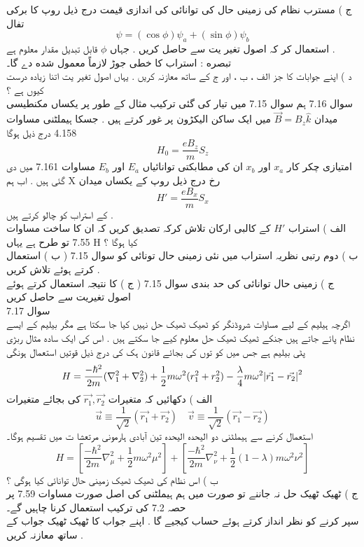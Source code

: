 ج ) مسترب نظام کی زمینی حال کی توانائی کی اندازی قیمت درج ذیل روپ کا برکی تفال
\[\psi=(\cos{\phi})\psi_{a}+(\sin{\phi})\psi_{b}\]
استعمال کر کہ اصول تغیر یت سے حاصل کریں . جہاں
\(\phi\)
قابل تبدیل مقدار معلوم ہے .\\
تبصره : استراب کا خطی جوڑ لازماً معمول شده دے گا۔\\
د ) اپنے جوابات کا جز الف ، ب ، اور ج کے ساتھ معازنہ کریں . یہاں اصول تغیر یت اتنا زیادہ درست کیوں ہے ؟\\
سوال 7.16
ہم سوال 7.15 میں تیار کی گئی ترکیب مثال کے طور پر  یکساں مکنطیسی میدان
\(\vec{B}=B_{z}\hat{k}\)
میں ایک ساکن الیکڑون پر غور کرتے ہیں . جسکا ہیملٹنی مساوات 4.158 درج ذیل ہوگا
\[H_{0}=\frac{eB_{z}}{m}S_{z}\]
امتیازی چکر کار
\(x_{a}\)
اور
\(x_{b}\)
ان کی مطابکتی توانائیاں
\(E_{a}\)
اور
\(E_{b}\)
مساوات 7.161 میں دی گئی ہیں .
اب ہم X رخ درج ذیل روپ کے یکساں میدان
\[H'=\frac{eB_{x}}{m}S_{x}\]
کے استراب کو چالو کرتے ہیں .\\
الف ) استراب
\(H'\)
کے کالبی ارکان تلاش کرکہ تصدیق کریں کہ ان کا ساخت مساوات 7.55 تو طرح ہے یہاں H کیا ہوگا ؟\\
ب ) دوم رتبی نظریہ استراب میں نئی زمینی حال تونائی کو سوال 7.15 ( ب ) استعمال کرتے ہوئے تلاش کریں .\\
ج ) زمینی حال توانائی کی حد بندی سوال 7.15 ( ج ) کا نتیجہ استعمال کرتے ہوئے اصول تغیریت سے حاصل کریں\\
سوال 
7.17\\
اگرچہ ہیلیم کے لیے مساوات شروڈنگر کو ٹھیک ٹھیک حل نہیں کیا جا سکتا ہے مگر بیلیم کے ایسے نظام پائے جاتے ہیں جنکے ٹھیک ٹھیک حل معلوم کیے جا سکتے ہیں . اس کی ایک ساده مثال ربڑی پٹی بیلیم ہے جس میں کو توں کی بجائے قانون ہک کی درج ذیل قوتیں استعمال ہونگی
\[H=\frac{-\hbar^{2}}{2m}(\nabla_{1}^{2}+\nabla_{2}^{2})+\frac{1}{2}m\omega^{2}(r_{1}^{2}+r_{2}^{2})-\frac{\lambda}{4}m\omega^{2}\abs{\vec{r_{1}}-\vec{r_{2}}}^{2}\]
الف ) دکھائیں کہ متغیرات
\(\vec{r_{1}}, \vec{r_{2}}\)
کی بجائے متغیرات
\[\vec{u}\equiv\frac{1}{\sqrt{2}}(\vec{r_{1}}+\vec{r_{2}})\quad \vec{v}\equiv\frac{1}{\sqrt{2}}(\vec{r_{1}}-\vec{r_{2}})\]
استعمال کرنے سے ہیملٹنی دو الیحدہ الیحدہ تین آبادی ہارمونی مرتعشا ت میں تقسیم ہوگا۔
\[H=[\frac{-\hbar^{2}}{2m}\nabla_{\mu}^{2}+\frac{1}{2}m\omega^{2}\mu^{2}]+[\frac{-\hbar^{2}}{2m}\nabla_{\nu}^{2}+\frac{1}{2}(1-\lambda)m\omega^{2}\nu^{2}]\]
ب ) اس نظام کی ٹھیک ٹھیک زمینی حال توانائی کیا ہوگی ؟\\
ج ) ٹھیک ٹھیک حل نہ جاننے تو صورت میں ہم ہیملٹنی کی اصل صورت مساوات 7.59 پر حصہ 7.2 کی ترکیب استعمال کرنا چاہیں گے۔\\
سپر کرنے کو نظر انداز کرتے ہوئے حساب کیجیے گا . اپنے جواب کا ٹھیک ٹھیک جواب کے ساتھ معازنہ کریں .\\
